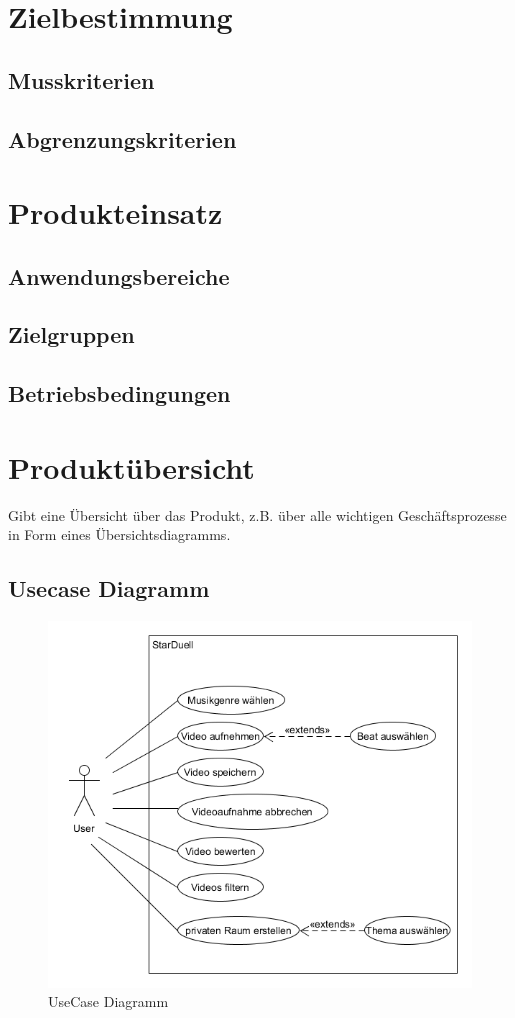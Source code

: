 \newpage
	\section{\Large Zielbestimmung}
	
	\subsection{Musskriterien}
	
	\subsection{Abgrenzungskriterien}

	
	\section{\Large Produkteinsatz}
	\subsection{Anwendungsbereiche}
	
	\subsection{Zielgruppen}

	\subsection{Betriebsbedingungen}

	\section{\Large Produktübersicht}
	Gibt eine Übersicht über das Produkt, z.B. über alle wichtigen Geschäftsprozesse in Form eines Übersichtsdiagramms.
	\subsection{Usecase Diagramm}
		\begin{figure}[H]
			\centering
			\includegraphics[width=0.7\linewidth]{images/UseCaseDiagramm}
			\caption{UseCase Diagramm}
			\label{fig:Usecase Diagramm}
		\end{figure}
		
